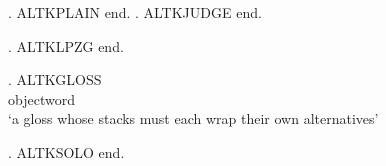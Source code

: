 

\ex. ALTKPLAIN  end.
\ex. ALTKJUDGE  end.

\ex. ALTKLPZG  end.

\ex. \gll ALTKGLOSS \\
     objectword \\
\glt `a gloss whose stacks must each wrap their own alternatives'

\ex. ALTKSOLO  end.

